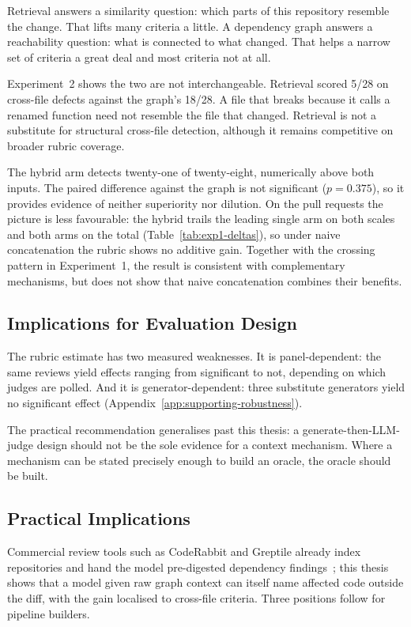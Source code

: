 Retrieval answers a similarity question: which parts of this repository
resemble the change. That lifts many criteria a little. A dependency graph
answers a reachability question: what is connected to what changed. That
helps a narrow set of criteria a great deal and most criteria not at all.

Experiment~2 shows the two are not interchangeable. Retrieval scored 5/28
on cross-file defects against the graph's 18/28. A file that breaks because
it calls a renamed function need not resemble the file that changed.
Retrieval is not a substitute for structural cross-file detection, although it
remains competitive on broader rubric coverage.

The hybrid arm detects twenty-one of twenty-eight, numerically above both
inputs. The paired difference against the graph is not significant
($p = 0.375$), so it provides evidence of neither superiority nor dilution.
On the pull requests the picture is less favourable: the hybrid trails the
leading single arm on both scales and both arms on the total
(Table~\ref{tab:exp1-deltas}), so under naive concatenation the rubric
shows no additive gain.
Together with the crossing pattern in Experiment~1, the result is consistent
with complementary mechanisms, but does not show that naive concatenation
combines their benefits.

\subsection{Implications for Evaluation Design}
\label{sec:discussion-measurement}

The rubric estimate has two measured weaknesses. It is panel-dependent: the
same reviews yield effects ranging from significant to not, depending on
which judges are polled. And it is generator-dependent: three substitute
generators yield no significant effect
(Appendix~\ref{app:supporting-robustness}).

The practical recommendation generalises past this thesis: a
generate-then-LLM-judge design should not be the sole evidence for a context
mechanism. Where a mechanism can be stated precisely enough to build an
oracle, the oracle should be built.

\subsection{Practical Implications}
\label{sec:discussion-practical}

Commercial review tools such as CodeRabbit and Greptile already index
repositories and hand the model pre-digested dependency
findings~\cite{coderabbit2026,greptile2026}; this thesis shows that a model
given raw graph context can itself name affected code outside the diff, with
the gain localised to cross-file criteria. Three positions follow for
pipeline builders.

